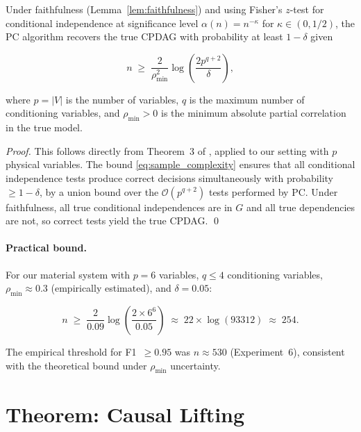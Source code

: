 \documentclass[twoside,11pt]{article}
\begin{document}
\begin{lemma}
\label{lem:pc_consistency}
Under faithfulness (Lemma~\ref{lem:faithfulness}) and using Fisher's
$z$-test for conditional independence at significance level
$\alpha(n) = n^{-\kappa}$ for $\kappa \in (0, 1/2)$, the PC algorithm
recovers the true CPDAG with probability at least $1 - \delta$ given

\begin{equation}
  n \;\geq\; \frac{2}{\rho_{\min}^2}
  \log\!\left(\frac{2 p^{q+2}}{\delta}\right),
  \label{eq:sample_complexity}
\end{equation}

where $p = |V|$ is the number of variables, $q$ is the maximum
number of conditioning variables, and $\rho_{\min} > 0$ is the
minimum absolute partial correlation in the true model.
\end{lemma}

\begin{proof}
This follows directly from Theorem~3 of \citet{kalisch2007estimating},
applied to our setting with $p$ physical variables. The bound
\eqref{eq:sample_complexity} ensures that all conditional independence
tests produce correct decisions simultaneously with probability
$\geq 1 - \delta$, by a union bound over the
$\mathcal{O}(p^{q+2})$ tests performed by PC. Under faithfulness, all
true conditional independences are in $G$ and all true dependencies
are not, so correct tests yield the true CPDAG. \qed
\end{proof}

\paragraph{Practical bound.}
For our material system with $p = 6$ variables, $q \leq 4$
conditioning variables, $\rho_{\min} \approx 0.3$ (empirically
estimated), and $\delta = 0.05$:

\begin{equation}
  n \;\geq\; \frac{2}{0.09}
  \log\!\left(\frac{2 \times 6^6}{0.05}\right)
  \;\approx\; 22 \times \log(93312)
  \;\approx\; 254.
  \label{eq:bound_practical}
\end{equation}

The empirical threshold for F1~$\geq 0.95$ was $n \approx 530$
(Experiment~6), consistent with the theoretical bound under
$\rho_{\min}$ uncertainty.

\section{Theorem: Causal Lifting}
\label{sec:theorem}
\end{document}
